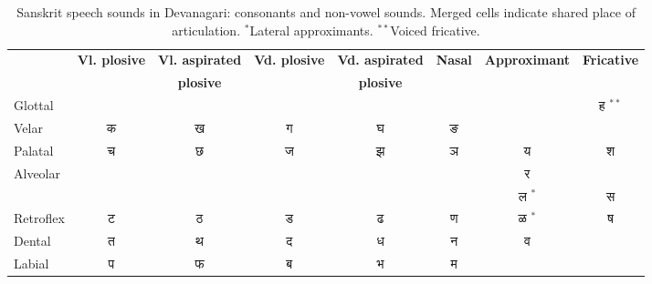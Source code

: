 \documentclass[10pt,a4paper]{article}
\begin{document}
\begin{table*}[ht]
	\centering
	\begin{center}
		\begin{tabular}{|l|c|c|c|c|c|c|c|}
			\hline
			& \textbf{Vl. plosive }&\textbf{Vl. aspirated }&\textbf{Vd. plosive }&\textbf{Vd. aspirated }&\textbf{Nasal}&\textbf{Approximant}&\multicolumn{1}{c|}{\textbf{Fricative}}\\
			& \textbf{}&\textbf{ plosive}&\textbf{ }&\textbf{ plosive}&\textbf{}&&
			\\
			\hline
			Glottal&&&&&&&ह \quad  [ɦə]$^{**}$\\	\hline
			Velar&क \quad[kə]	&ख \quad [kʰə]&	ग \quad [gə]&	घ \quad [gʰə]& ङ \quad [ŋə]&&\\\hline
			Palatal& च \quad [t͡ɕə]&	छ \quad  [t͡ɕʰə]& ज \quad  [d͡ʑə]&	झ \quad  [d͡ʑʱə]& ञ \quad  [ɲə]&य \quad  [jə]&\multirow{2}{*}{श \quad  [ɕə]}\\\cline{1-7}
			\multirow{2}{*}{Alveolar}&&&&&&र \quad  [ɹə]&\\\cline{8-8}
			&&&&&&ल  \quad [lə]$^*$&स \quad  [sə]\\\hline
			Retroflex& ट \quad  [ʈə]&	ठ \quad  [ʈʰə]& 	ड \quad  [ɖə]& ढ \quad  [ɖʰə]&	ण \quad  [ɳə]&ळ \quad  [ɭə]$^*$&ष \quad  [ʂə]\\\hline
			Dental& त \quad  [t̪ə]& 	थ \quad  [t̪ʰə]&	द \quad  [d̪ə]&		ध \quad  [d̪ʰə]& न \quad  [nə]&\multirow{2}{*}{व \quad  [ʋə]}&\\\cline{1-6}\cline{8-8}
			Labial & प \quad  [pə]& 	फ \quad  [pʰə]& ब \quad  [bə]& 	भ \quad  [bʱə]& म \quad  [mə]&&\\\hline
			
		\end{tabular}
		\caption{Sanskrit speech sounds in Devanagari: consonants and non-vowel sounds. Merged cells indicate shared place of articulation.
		$^*$Lateral approximants. $^{**}$Voiced fricative.}
		\label{consonants-table}
	\end{center}
\end{table*}
\end{document}
